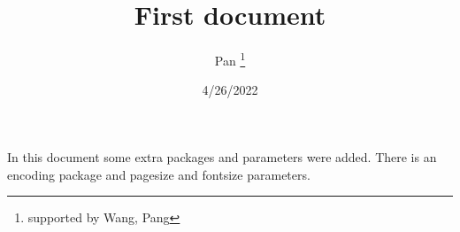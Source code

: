 \documentclass[12pt, letterpaper]{article}
\title{First document}
\author{Pan \thanks{supported by Wang, Pang}}
\date{4/26/2022}
\begin{document}
	
	\begin{titlepage}
		\maketitle
	\end{titlepage}
	
	In this document some extra packages and parameters
	were added. There is an encoding package
	and pagesize and fontsize parameters.
	
\end{document}

